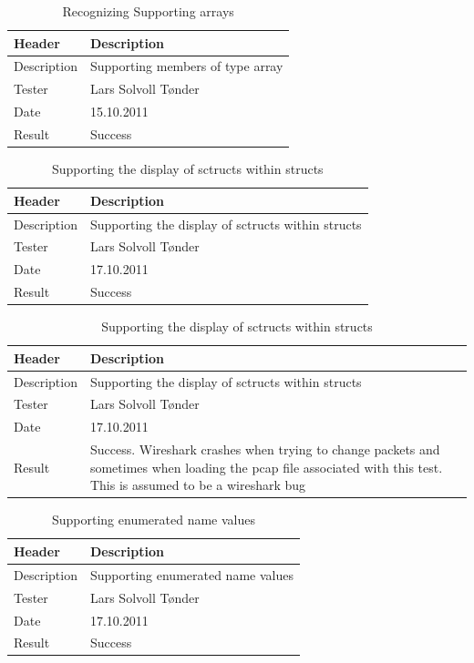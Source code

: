 \begin{table}[!htb] \footnotesize \center
\caption{Recognizing Supporting arrays \label{tab:sp2TID09}}
\begin{tabular}{l l}
	\toprule
	Header & Description \\
	\midrule
	Description &  Supporting members of type array   \\
	Tester & Lars Solvoll Tønder \\
	Date & 15.10.2011 \\
	Result & Success\\
	\bottomrule
\end{tabular}
\end{table}

\begin{table}[!htb] \footnotesize \center
\caption{Supporting the display of sctructs within structs \label{tab:sp2TID09}}
\begin{tabular}{l l}
	\toprule
	Header & Description \\
	\midrule
	Description &  Supporting the display of sctructs within structs \\
	Tester & Lars Solvoll Tønder \\
	Date & 17.10.2011 \\
	Result & Success\\
	\bottomrule
\end{tabular}
\end{table}

\begin{table}[!htb] \footnotesize \center
\caption{Supporting the display of sctructs within structs \label{tab:sp2TID10}}
\begin{tabular}{l l}
	\toprule
	Header & Description \\
	\midrule
	Description &  Supporting the display of sctructs within structs \\
	Tester & Lars Solvoll Tønder \\
	Date & 17.10.2011 \\
	Result & Success. Wireshark crashes when trying to change packets and sometimes when loading the pcap file associated with this test. This is assumed to be a wireshark bug\\
	\bottomrule
\end{tabular}
\end{table}

\begin{table}[!htb] \footnotesize \center
\caption{Supporting enumerated name values \label{tab:sp2TID11}}
\begin{tabular}{l l}
	\toprule
	Header & Description \\
	\midrule
	Description &  Supporting enumerated name values \\
	Tester & Lars Solvoll Tønder \\
	Date & 17.10.2011 \\
	Result & Success\\
	\bottomrule
\end{tabular}
\end{table}


